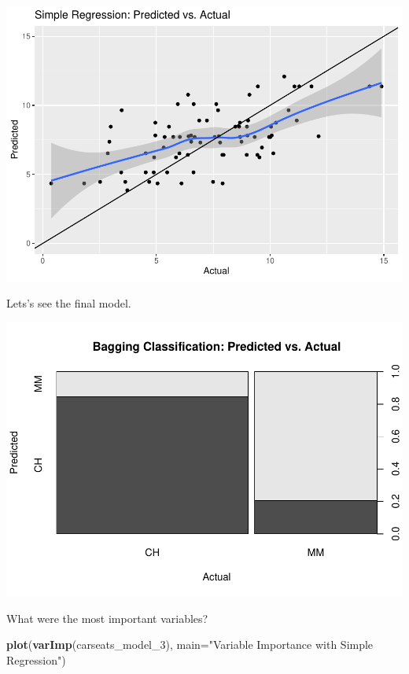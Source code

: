 \documentclass[
]{book}
\newenvironment{Shaded}{\begin{snugshade}}{\end{snugshade}}
\newcommand{\DataTypeTok}[1]{\textcolor[rgb]{0.13,0.29,0.53}{#1}}
\newcommand{\DecValTok}[1]{\textcolor[rgb]{0.00,0.00,0.81}{#1}}
\newcommand{\KeywordTok}[1]{\textcolor[rgb]{0.13,0.29,0.53}{\textbf{#1}}}
\newcommand{\NormalTok}[1]{#1}
\newcommand{\OperatorTok}[1]{\textcolor[rgb]{0.81,0.36,0.00}{\textbf{#1}}}
\newcommand{\StringTok}[1]{\textcolor[rgb]{0.31,0.60,0.02}{#1}}
\begin{document}
\includegraphics{data-sci_files/figure-latex/unnamed-chunk-77-1.pdf}

Lets's see the final model.

\begin{Shaded}
\end{Shaded}

\includegraphics{data-sci_files/figure-latex/unnamed-chunk-78-1.pdf}

What were the most important variables?

\begin{Shaded}
\begin{Highlighting}[]
\KeywordTok{plot}\NormalTok{(}\KeywordTok{varImp}\NormalTok{(carseats_model_}\DecValTok{3}\NormalTok{), }\DataTypeTok{main=}\StringTok{"Variable Importance with Simple Regression"}\NormalTok{)}
\end{Highlighting}
\end{Shaded}
\end{document}
